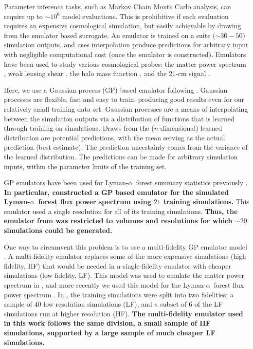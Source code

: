 \documentclass[a4paper,11pt]{article}
\newcommand{\lya}{Lyman-$\alpha$\ }
\begin{document}
Parameter inference tasks, such as Markov Chain Monte Carlo analysis, can require up to $\sim10^6$ model evaluations.
This is prohibitive if each evaluation requires an expensive cosmological simulation, but easily achievable by drawing from the emulator based surrogate.
An emulator is trained on a suite ($\sim 30-50$) simulation outputs, and uses interpolation produce predictions for arbitrary input with negligible computational cost (once the emulator is constructed).
Emulators have been used to study various cosmological probes: the matter power spectrum \citep{Heitmann:2009, Heitmann:2014, Lawrence:2017, Giblin:2019, Euclid:2021, Arico:2021, Giri:2021}, weak lensing  shear \citep{Harnois:2019, Davies:2021}, the halo mass function \citep{McClintock:2019, Nishimichi:2019, Bocquet:2022}, and the 21-cm signal \citep{Kern:2017, Cohen:2020, Bevins:2021, Bye:2022}.

Here, we use a Gaussian process (GP) based emulator following \cite{2019JCAP...02..050B, 2022MNRAS.517.3200F}.
Gaussian processes are flexible, fast and easy to train, producing good results even for our relatively small training data set.
Gaussian processes \citep{2006gpml.book.....R} are a means of interpolating between the simulation outputs via a distribution of functions that is learned through training on simulations.
Draws from the ($n$-dimensional) learned distribution are potential predictions, with the mean serving as the actual prediction (best estimate).
The prediction uncertainty comes from the variance of the learned distribution.
The predictions can be made for arbitrary simulation inputs, within the parameter limits of the training set.

GP emulators have been used for \lya forest summary statistics previously \citep{2019JCAP...02..050B, Rogers:2019, 2021JCAP...05..033P, 2021JCAP...04..059W, Rogers:2021a,2021PhRvL.126g1302R}.
\textbf{In particular, \cite{2019JCAP...02..050B} constructed a GP based emulator for the simulated \lya forest flux power spectrum using $21$ training simulations.}
This emulator used a single resolution for all of its training simulations.
\textbf{Thus, the emulator from \cite{2019JCAP...02..050B} was restricted to volumes and resolutions for which $\sim20$ simulations could be generated.}

One way to circumvent this problem is to use a multi-fidelity GP emulator model \cite{10.1093/biomet/87.1.1}.
A multi-fidelity emulator replaces some of the more expensive simulations (high fidelity, HF) that would be needed in a single-fidelity emulator with cheaper simulations (low fidelity, LF).
This model was used to emulate the matter power spectrum in \cite{2022MNRAS.509.2551H}, and more recently we used this model for the \lya forest flux power spectrum \cite{2022MNRAS.517.3200F}.
In \cite{2022MNRAS.517.3200F}, the training simulations were split into two fidelities; a sample of $40$ low resolution simulations (LF), and a subset of $6$ of the LF simulations run at higher resolution (HF).
\textbf{The multi-fidelity emulator used in this work follows the same division, a small sample of HF simulations, supported by a large sample of much cheaper LF simulations.}
\end{document}
